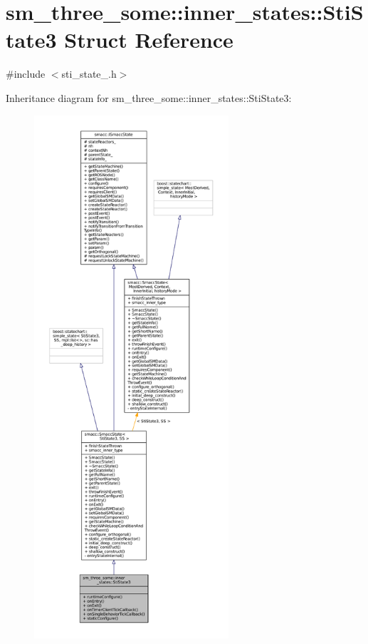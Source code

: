 \hypertarget{structsm__three__some_1_1inner__states_1_1StiState3}{}\section{sm\+\_\+three\+\_\+some\+:\+:inner\+\_\+states\+:\+:Sti\+State3 Struct Reference}
\label{structsm__three__some_1_1inner__states_1_1StiState3}


{\ttfamily \#include $<$sti\+\_\+state\+\_.\+h$>$}



Inheritance diagram for sm\+\_\+three\+\_\+some\+:\+:inner\+\_\+states\+:\+:Sti\+State3\+:
\nopagebreak
\begin{figure}[H]
\begin{center}
\leavevmode
\includegraphics[height=550pt]{structsm__three__some_1_1inner__states_1_1StiState3__inherit__graph}
\end{center}
\end{figure}



